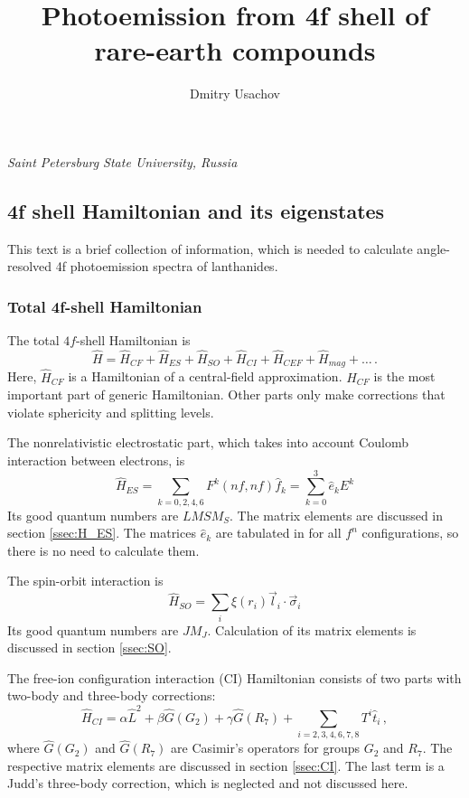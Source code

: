 \documentclass[a4paper,oneside,12pt]{extarticle}
\title{Photoemission from 4f shell of rare-earth compounds}
\author{Dmitry Usachov}
\begin{document}
\maketitle
\begin{center} 
\it Saint Petersburg State University, Russia
\end{center}

\tableofcontents
\newpage
%
\subsection {4f shell Hamiltonian and its eigenstates}

This text is a brief collection of information, which is needed to calculate angle-resolved 4f photoemission spectra of lanthanides.

\subsubsection {Total 4f-shell Hamiltonian}
%
The total $4f$-shell Hamiltonian is
%
\begin{equation}
\hat{H} = \hat{H}_{CF} + \hat{H}_{ES} + \hat{H}_{SO} + \hat{H}_{CI} + \hat{H}_{CEF} + \hat{H}_{mag} +\ldots \,.
\end{equation}
%
Here, $\hat{H}_{CF}$ is a Hamiltonian of a central-field approximation. $\hat{H}_{CF}$ is the most important part of generic Hamiltonian. Other parts only make corrections that violate sphericity and splitting levels.

The nonrelativistic electrostatic part, which takes into account Coulomb interaction between electrons, is
$$
\hat{H}_{ES} = \sum_{k=0,2,4,6} F^k(nf,nf) \hat{f}_k = \sum_{k=0}^3 \hat{e}_k E^k
$$
%
Its good quantum numbers are $LMSM_S$. The matrix elements are discussed in section \ref{ssec:H_ES}. The matrices $\hat{e}_k$ are tabulated in \cite{NielsonKoster} for all $f^n$ configurations, so there is no need to calculate them.

The spin-orbit interaction is 
$$
\hat{H}_{SO} = \sum_i \xi(r_i) \vec{l}_i \cdot \vec{\sigma}_i
$$
%
Its good quantum numbers are $JM_J$. Calculation of its matrix elements is discussed in section \ref{ssec:SO}.

The free-ion configuration interaction (CI) Hamiltonian consists of two parts with two-body and three-body corrections:
$$
\hat{H}_{CI} = \alpha \hat{L}^2 + \beta \hat{G} (G_2) + \gamma \hat{G} (R_7)
+ \sum_{i=2,3,4,6,7,8} T^i \hat{t}_i \,,
$$
where $\hat{G}(G_2)$ and $\hat{G}(R_7)$ are Casimir's operators for groups $G_2$ and $R_7$. The respective matrix elements are discussed in section \ref{ssec:CI}. The last term is a Judd's three-body correction, which is neglected and not discussed here.
\end{document}
